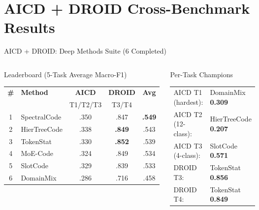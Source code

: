 \documentclass[aspectratio=169, 10pt]{beamer}
\begin{document}
\section{AICD + DROID Cross-Benchmark Results}

\begin{frame}{AICD + DROID: Deep Methods Suite (6 Completed)}
\vspace{-0.2cm}
\begin{columns}[T]
\begin{block}{Leaderboard (5-Task Average Macro-F1)}
\centering\scriptsize
\begin{tabular}{clccc}
\toprule
\textbf{\#} & \textbf{Method} & \textbf{AICD} & \textbf{DROID} & \textbf{Avg} \\
& & {\tiny T1/T2/T3} & {\tiny T3/T4} & \\
\midrule
\rowcolor{oursgreen}
1 & SpectralCode & .350 & .847 & \textbf{.549} \\
2 & HierTreeCode & .338 & \textbf{.849} & .543 \\
3 & TokenStat & .330 & \textbf{.852} & .539 \\
4 & MoE-Code & .324 & .849 & .534 \\
5 & SlotCode & .329 & .839 & .533 \\
6 & DomainMix & .286 & .716 & .458 \\
\bottomrule
\end{tabular}
\end{block}

\begin{alertblock}{\scriptsize Per-Task Champions}
\scriptsize
\begin{tabular}{ll}
AICD T1 (hardest): & DomainMix \textbf{0.309} \\
AICD T2 (12-class): & HierTreeCode \textbf{0.207} \\
AICD T3 (4-class): & SlotCode \textbf{0.571} \\
DROID T3: & TokenStat \textbf{0.856} \\
DROID T4: & TokenStat \textbf{0.849} \\
\end{tabular}
\end{alertblock}


\end{columns}
\end{frame}
\end{document}
